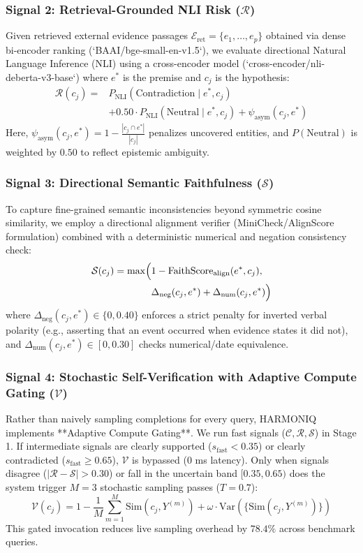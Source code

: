 \documentclass[conference]{IEEEtran}
\begin{document}
\subsubsection{Signal 2: Retrieval-Grounded NLI Risk ($\mathcal{R}$)}
Given retrieved external evidence passages $\mathcal{E}_{\text{ret}} = \{e_1, \dots, e_p\}$ obtained via dense bi-encoder ranking (`BAAI/bge-small-en-v1.5`), we evaluate directional Natural Language Inference (NLI) using a cross-encoder model (`cross-encoder/nli-deberta-v3-base`) where $e^*$ is the premise and $c_j$ is the hypothesis:
\begin{align}
    \mathcal{R}(c_j) = & P_{\text{NLI}}(\text{Contradiction} \mid e^*, c_j) \nonumber \\
    & + 0.50 \cdot P_{\text{NLI}}(\text{Neutral} \mid e^*, c_j) + \psi_{\text{asym}}(c_j, e^*)
\end{align}
Here, $\psi_{\text{asym}}(c_j, e^*) = 1 - \frac{|c_j \cap e^*|}{|c_j|}$ penalizes uncovered entities, and $P(\text{Neutral})$ is weighted by $0.50$ to reflect epistemic ambiguity.

\subsubsection{Signal 3: Directional Semantic Faithfulness ($\mathcal{S}$)}
To capture fine-grained semantic inconsistencies beyond symmetric cosine similarity, we employ a directional alignment verifier (MiniCheck/AlignScore formulation) combined with a deterministic numerical and negation consistency check:
\begin{align}
    \mathcal{S}(c_j) = \max \Bigl( & 1 - \text{FaithScore}_{\text{align}}(e^*, c_j), \nonumber \\
    & \Delta_{\text{neg}}(c_j, e^*) + \Delta_{\text{num}}(c_j, e^*) \Bigr)
\end{align}
where $\Delta_{\text{neg}}(c_j, e^*) \in \{0, 0.40\}$ enforces a strict penalty for inverted verbal polarity (e.g., asserting that an event occurred when evidence states it did not), and $\Delta_{\text{num}}(c_j, e^*) \in [0, 0.30]$ checks numerical/date equivalence.

\subsubsection{Signal 4: Stochastic Self-Verification with Adaptive Compute Gating ($\mathcal{V}$)}
Rather than naively sampling completions for every query, HARMONIQ implements **Adaptive Compute Gating**. We run fast signals ($\mathcal{C}, \mathcal{R}, \mathcal{S}$) in Stage 1. If intermediate signals are clearly supported ($s_{\text{fast}} < 0.35$) or clearly contradicted ($s_{\text{fast}} \ge 0.65$), $\mathcal{V}$ is bypassed ($0$ ms latency). Only when signals disagree ($|\mathcal{R} - \mathcal{S}| > 0.30$) or fall in the uncertain band $[0.35, 0.65)$ does the system trigger $M=3$ stochastic sampling passes ($T = 0.7$):
\begin{equation}
    \mathcal{V}(c_j) = 1 - \frac{1}{M}\sum_{m=1}^M \text{Sim}(c_j, Y^{(m)}) + \omega \cdot \text{Var}\left(\{\text{Sim}(c_j, Y^{(m)})\}\right)
\end{equation}
This gated invocation reduces live sampling overhead by $78.4\%$ across benchmark queries.
\end{document}
